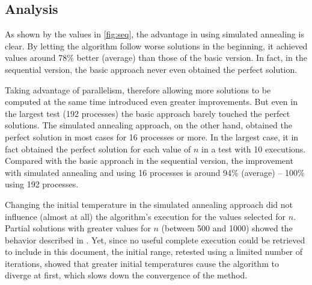 \subsection{Analysis}
\label{sec:analysis}

As shown by the values in \cref{fig:seq}, the advantage in using simulated annealing is clear. By letting the algorithm follow worse solutions in the beginning, it achieved values around 78\% better (average) than those of the basic version. In fact, in the sequential version, the basic approach never even obtained the perfect solution.

Taking advantage of parallelism, therefore allowing more solutions to be computed at the same time introduced even greater improvements. But even in the largest test (192 processes) the basic approach barely touched the perfect solutions. The simulated annealing approach, on the other hand, obtained the perfect solution in most cases for 16 processes or more. In the largest case, it in fact obtained the perfect solution for each value of $n$ in a test with 10 executions. Compared with the basic approach in the sequential version, the improvement with simulated annealing and using 16 processes is around 94\% (average) -- 100\% using 192 processes.

Changing the initial temperature in the simulated annealing approach did not influence (almost at all) the algorithm's execution for the values selected for $n$. Partial solutions with greater values for $n$ (between 500 and 1000) showed the behavior described in \cite{Quinn2004}. Yet, since no useful complete execution could be retrieved to include in this document, the initial range, retested using a limited number of iterations, showed that greater initial temperatures cause the algorithm to diverge at first, which slows down the convergence of the method.
